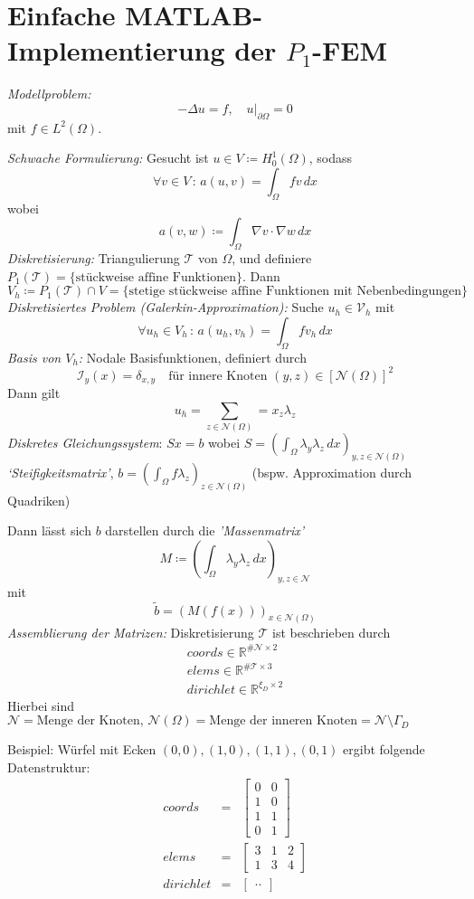 \documentclass[oneside,a4paper]{amsart}
\begin{document}
\section*{Einfache MATLAB-Implementierung der $P_1$-FEM}

\emph{Modellproblem:}
\[
	-\Delta u = f,\quad u|_{\partial\Omega} = 0
\]
mit $f\in L^2(\Omega)$.\par
\emph{Schwache Formulierung:} Gesucht ist $u\in V \coloneqq H^1_0(\Omega)$, sodass
\[
	\forall v\in V\,:\, a(u,v) = \int_\Omega fv\,dx
\]
wobei
\[
	a(v,w) \coloneqq \int_\Omega\nabla v\cdot\nabla w\,dx
\]
\emph{Diskretisierung:} Triangulierung $\mathcal{T}$ von $\Omega$, und definiere $P_1(\mathcal{T}) = \{\text{stückweise affine Funktionen}\}$. Dann
\[
	V_h \coloneqq P_1(\mathcal{T})\cap V = \{\text{stetige stückweise affine Funktionen mit Nebenbedingungen}\}
\]
\emph{Diskretisiertes Problem (Galerkin-Approximation):} Suche $u_h\in\mathcal{V}_h$ mit 
\[
	\forall u_h\in V_h\,:\,a(u_h,v_h) = \int_\Omega f v_h\, dx
\]
\emph{Basis von $V_h$:} Nodale Basisfunktionen, definiert durch
\[
	\mathcal{I}_y(x) = \delta_{x,y}\quad\text{für innere Knoten }(y,z)\in\left[\mathcal{N}(\Omega)\right]^2
\]
Dann gilt
\[
	u_h = \sum_{z\in\mathcal{N}(\Omega)} = x_z\lambda_z
\]
\emph{Diskretes Gleichungssystem}: $Sx = b$ wobei $S = \left(\int_\Omega \lambda_y\lambda_z\, dx\right)_{y,z\in\mathcal{N}(\Omega)}$ \emph{`Steifigkeitsmatrix'}, $b=\left(\int_\Omega f\lambda_z\right)_{z\in\mathcal{N}(\Omega)}$ (bspw. Approximation durch Quadriken)\par
Dann lässt sich $b$ darstellen durch die \emph{'Massenmatrix'} 
\[
	M\coloneqq \left(\int_\Omega \lambda_y\lambda_z\,dx\right)_{y,z\in\mathcal{N}}
\]
mit 
\[
	\tilde{b} = \left( M(f(x)) \right)_{x\in\mathcal{N}(\Omega)}
\]
\emph{Assemblierung der Matrizen:} Diskretisierung $\mathcal{T}$ ist beschrieben durch
\begin{eqnarray*}
	coords\in\mathbb{R}^{\# \mathcal{N}\times 2}\\
	elems\in\mathbb{R}^{\#\mathcal{T}\times 3}\\
	dirichlet\in\mathbb{R}^{\xi_D\times 2}
\end{eqnarray*}
Hierbei sind $\mathcal{N} = \text{Menge der Knoten},\,\mathcal{N}(\Omega) = \text{Menge der inneren Knoten} = \mathcal{N}\setminus\Gamma_D$

Beispiel: Würfel mit Ecken $(0,0),(1,0),(1,1),(0,1)$ ergibt folgende Datenstruktur:
\begin{eqnarray*}
	coords &=& \begin{bmatrix} 0 & 0\\ 1 & 0 \\ 1 & 1 \\ 0 & 1\end{bmatrix} \\
	elems &=& \begin{bmatrix}3&1&2\\1&3&4\end{bmatrix}\\
	dirichlet &=& \begin{bmatrix}..\end{bmatrix} %
\end{eqnarray*}
\end{document}

